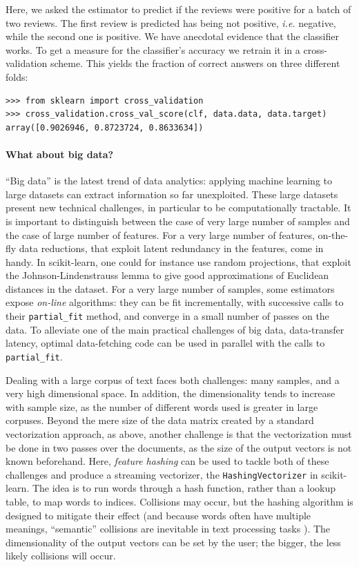 \documentclass[a4paper]{article}
\begin{document}
Here, we asked the estimator to predict if the reviews were positive for
a batch of two reviews. The first review is predicted has being not
positive, \emph{i.e.} negative, while the second one is positive. We have
anecdotal evidence that the classifier works. To get a measure for the
classifier's accuracy we retrain it in a cross-validation scheme.
This yields the fraction of correct answers on three different folds:
\begin{lstlisting}
>>> from sklearn import cross_validation
>>> cross_validation.cross_val_score(clf, data.data, data.target)
array([0.9026946, 0.8723724, 0.8633634])
\end{lstlisting}

\paragraph{What about big data?}
%
``Big data'' is the latest trend of data analytics: applying machine
learning to large datasets can extract information so far unexploited.
These large datasets present new technical challenges, in
particular to be computationally tractable. It is important to
distinguish between the case of very large number of samples and the case of large
number of features. For a very large number of features, on-the-fly data
reductions, that exploit latent redundancy in the features, come in
handy. In scikit-learn, one could for instance use
random projections, that exploit the Johnson-Lindenstrauss lemma to give
good approximations of Euclidean distances in the dataset. For
a very large number of samples, some estimators expose
\emph{on-line} algorithms: they can be fit incrementally, with successive
calls to their {\tt partial\_fit} method, and converge in a small number
of passes on the data. To alleviate one of the main practical challenges of
big data, data-transfer latency, optimal data-fetching code can be used
in parallel with the calls to {\tt partial\_fit}.

Dealing with a large corpus of text faces both challenges: many samples,
and a very high dimensional space. In addition, the dimensionality
tends to increase with sample size, as the number of different words used
is greater in large corpuses. Beyond the mere size of the data matrix
created by a standard vectorization approach, as above, another challenge
is that the vectorization must be done in two passes over the documents,
as the size of the output vectors is not known beforehand.
Here, \emph{feature hashing} can be used
to tackle both of these challenges and produce a streaming vectorizer,
the {\tt HashingVectorizer} in scikit-learn.
The idea is to run words through a hash function, rather than a lookup table,
to map words to indices.
Collisions may occur, but the hashing algorithm \cite{weinberger2009}
is designed to mitigate their effect
(and because words often have multiple meanings,
``semantic'' collisions are inevitable in text processing tasks
\cite{attenberg2009}).
The dimensionality of the output vectors can be set by the user;
the bigger, the less likely collisions will occur.
\end{document}

